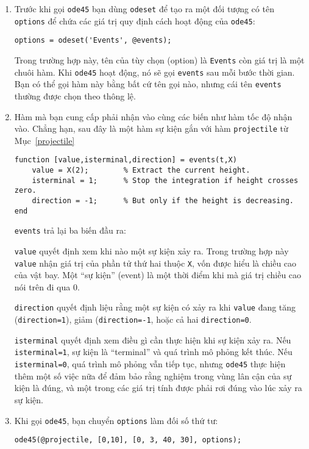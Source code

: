 \documentclass[12pt]{book}
\begin{document}
\begin{enumerate}

\item Trước khi gọi {\tt ode45} bạn dùng {\tt odeset} để tạo ra một
đối tượng có tên {\tt options} để chứa các giá trị quy định cách 
hoạt động của {\tt ode45}:

\begin{verbatim}
options = odeset('Events', @events);
\end{verbatim}
%
Trong trường hợp này, tên của tùy chọn (option) là {\tt Events} còn
giá trị là một chuôi hàm. Khi {\tt ode45} hoạt động, nó sẽ gọi
{\tt events} sau mỗi bước thời gian. Bạn có thể gọi hàm này bằng
bất cứ tên gọi nào, nhưng cái tên {\tt events} thường được chọn
theo thông lệ.

\item Hàm mà bạn cung cấp phải nhận vào cùng các biến như 
hàm tốc độ nhận vào. Chẳng hạn, sau đây là một hàm sự kiện 
gắn với hàm {\tt projectile} từ Mục~\ref{projectile}

\begin{verbatim}
function [value,isterminal,direction] = events(t,X)
    value = X(2);        % Extract the current height.
    isterminal = 1;      % Stop the integration if height crosses zero.
    direction = -1;      % But only if the height is decreasing.
end
\end{verbatim}
%
{\tt events} trả lại ba biến đầu ra:

{\tt value} quyết định xem khi nào một sự kiện xảy ra. Trong 
trường hợp này {\tt value} nhận giá trị của phần tử thứ hai thuộc
{\tt X}, vốn được hiểu là chiều cao của vật bay. Một ``sự kiện''
(event) là một thời điểm khi mà giá trị chiều cao nói trên đi qua 0.

{\tt direction} quyết định liệu rằng một sự kiện có xảy ra khi
{\tt value} đang tăng ({\tt direction=1}), giảm 
({\tt direction=-1}, hoặc cả hai {\tt direction=0}.

{\tt isterminal} quyết định xem điều gì cần thực hiện khi sự kiện
xảy ra. Nếu {\tt isterminal=1}, sự kiện là ``terminal'' và quá trình
mô phỏng kết thúc. Nếu {\tt isterminal=0}, quá trình mô phỏng
vẫn tiếp tục, nhưng {\tt ode45} thực hiện thêm một số việc nữa
để đảm bảo rằng nghiệm trong vùng lân cận của sự kiện là đúng,
và một trong các giá trị tính được phải rơi đúng vào lúc xảy ra
sự kiện.

\item Khi gọi {\tt ode45}, bạn chuyển {\tt options} làm đối số
thứ tư:

\begin{verbatim}
ode45(@projectile, [0,10], [0, 3, 40, 30], options);
\end{verbatim}
%
\end{enumerate}
\end{document}
